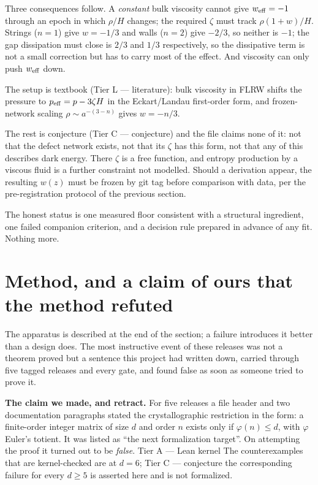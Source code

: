 \documentclass[11pt,a4paper]{article}
\theoremstyle{remark}
\newcommand{\tierA}{\colorbox{green!15}{\textsf{\scriptsize Tier A --- Lean kernel}}}
\newcommand{\tierL}{\colorbox{blue!10}{\textsf{\scriptsize Tier L --- literature}}}
\newcommand{\tierC}{\colorbox{orange!15}{\textsf{\scriptsize Tier C --- conjecture}}}
\begin{document}
Three consequences follow. A \emph{constant} bulk viscosity cannot give $w_{\rm eff} = -1$ through an epoch in which $\rho/H$ changes; the required $\zeta$ must track $\rho(1+w)/H$. Strings ($n=1$) give $w = -1/3$ and walls ($n=2$) give $-2/3$, so neither is $-1$; the gap dissipation must close is $2/3$ and $1/3$ respectively, so the dissipative term is not a small correction but has to carry most of the effect. And viscosity can only push $w_{\rm eff}$ down.

The setup is textbook (\tierL): bulk viscosity in FLRW shifts the pressure to $p_{\rm eff} = p - 3\zeta H$ in the Eckart/Landau first-order form, and frozen-network scaling $\rho \sim a^{-(3-n)}$ gives $w = -n/3$.

The rest is conjecture (\tierC) and the file claims none of it: not that the defect network exists, not that its $\zeta$ has this form, not that any of this describes dark energy. There $\zeta$ is a free function, and entropy production by a viscous fluid is a further constraint not modelled. Should a derivation appear, the resulting $w(z)$ must be frozen by git tag before comparison with data, per the pre-registration protocol of the previous section.

The honest status is one measured floor consistent with a structural ingredient, one failed companion criterion, and a decision rule prepared in advance of any fit. Nothing more.


\section{Method, and a claim of ours that the method refuted}\label{sec:method}

The apparatus is described at the end of the section; a failure introduces it
better than a design does. The most instructive event of these releases was not a
theorem proved but a sentence this project had written down, carried through five
tagged releases and every gate, and found false as soon as someone tried to prove
it.

\begin{correctionbox}
\textbf{The claim we made, and retract.} For five releases a file header and two
documentation paragraphs stated the crystallographic restriction in the form: a
finite-order integer matrix of size $d$ and order $n$ exists only if
$\varphi(n) \le d$, with $\varphi$ Euler's totient. It was listed as
``the next formalization target''. On attempting the proof it turned out to be
\emph{false}. \tierA{} The counterexamples that are kernel-checked are at $d = 6$;
\tierC{} the corresponding failure for every $d \ge 5$ is asserted here and is not
formalized.
\end{correctionbox}
\end{document}
